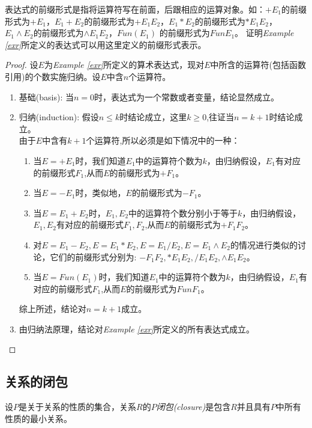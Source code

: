 \begin{example}
	表达式的前缀形式是指将运算符写在前面，后跟相应的运算对象。如：$+E_1$的前缀形式为$+E_1$，$E_1+E_2$的前缀形式为$+E_1E_2$，$E_1\ast E_2$的前缀形式为$\ast E_1E_2$， $E_1\land E_2$的前缀形式为$\land E_1E_2$，$Fun(E_1)$ 的前缀形式为$FunE_1$。
	证明\textit{Example \ref{exr}}所定义的表达式可以用这里定义的前缀形式表示。 	
\end{example}

\begin{proof}
	设$E$为\textit{Example \ref{exr}}所定义的算术表达式，现对$E$中所含的运算符(包括函数引用)的个数实施归纳。设$E$中含$n$个运算符。
	\begin{enumerate}
		\item 基础(basis): 当$n=0$时，表达式为一个常数或者变量，结论显然成立。
		\item 归纳(induction): 假设$n\le k$时结论成立，这里$k\ge 0$,往证当$n=k+1$时结论成立。\\
		由于$E$中含有$k+1$个运算符,所以必须是如下情况中的一种：
		\begin{enumerate}
			\item 当$E=+E_1$时，我们知道$E_1$中的运算符个数为$k$，由归纳假设，$E_1$有对应的前缀形式$F_1$,从而$E$的前缀形式为$+F_1$。
			\item 当$E=-E_1$时，类似地，$E$的前缀形式为$-F_1$。
			\item 当$E=E_1+E_2$时，$E_1,E_2$中的运算符个数分别小于等于$k$，由归纳假设，$E_1,E_2$有对应的前缀形式$F_1,F_2$,从而$E$的前缀形式为$+F_1F_2$。
			\item 对$E=E_1-E_2,E=E_1\ast E_2,E=E_1/E_2,E=E_1\land E_2 $的情况进行类似的讨论，它们的前缀形式分别为: $-F_1F_2,\ast E_1E_2,/E_1E_2,\land E_1E_2$。
			\item 当$E=Fun(E_1)$时，我们知道$E_1$中的运算符个数为$k$，由归纳假设，$E_1$有对应的前缀形式$F_1$,从而$E$的前缀形式为$FunF_1$。
		\end{enumerate}
	    综上所述，结论对$n=k+1$成立。
	    \item 由归纳法原理，结论对\textit{Example \ref{exr}}所定义的所有表达式成立。
	\end{enumerate}
\end{proof}

\subsection{关系的闭包}

\begin{definition}
	设$P$是关于关系的性质的集合，关系$R$的\emph{$P$闭包(closure)}是包含$R$并且具有$P$中所有性质的最小关系。
\end{definition}

